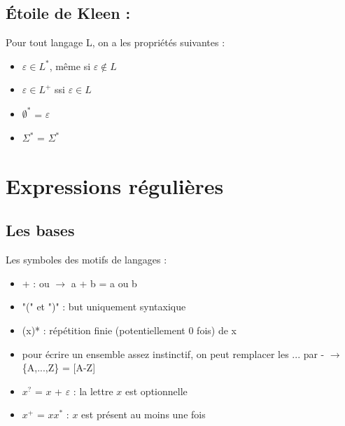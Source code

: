 \documentclass{article}
\begin{document}
\subsection{Étoile de Kleen :}
Pour tout langage L, on a les propriétés suivantes :
\begin{itemize}
    \item $\varepsilon \in L^{*}$, même si $\varepsilon \notin L$
    \item $\varepsilon \in L^{+}$ ssi $\varepsilon \in L$
    \item $\emptyset^{*}$ = $\varepsilon$
    \item $\Sigma^{*}$ = $\Sigma^{*}$
\end{itemize}
\newpage













\section{Expressions régulières}
\subsection{Les bases}
Les symboles des motifs de langages :
\begin{itemize}
    \item + : ou $\rightarrow$ a + b = a ou b
    \item "(" et ")" : but uniquement syntaxique
    \item (x)* : répétition finie (potentiellement 0 fois) de x
    \item pour écrire un ensemble assez instinctif, on peut remplacer les ... par - \newline $\rightarrow$ \{A,...,Z\} = [A-Z]
    \item $x^{?}$ = $x$ + $\varepsilon$ : la lettre $x$ est optionnelle
    \item $x^{+}$ = $xx^{*}$ : $x$ est présent au moins une fois
\end{itemize}
\end{document}
